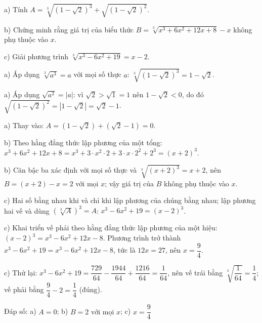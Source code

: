 \begin{problem}[9DS-CAN-015]
a) Tính $A = \sqrt[3]{(1 - \sqrt{2})^3} + \sqrt{(1 - \sqrt{2})^2}$.

b) Chứng minh rằng giá trị của biểu thức $B = \sqrt[3]{x^3 + 6x^2 + 12x + 8} - x$ không phụ thuộc vào $x$.

c) Giải phương trình $\sqrt[3]{x^3 - 6x^2 + 19} = x - 2$.

\begin{solution}
a) Áp dụng $\sqrt[3]{a^3} = a$ với mọi số thực $a$: $\sqrt[3]{(1 - \sqrt{2})^3} = 1 - \sqrt{2}$.

a) Áp dụng $\sqrt{a^2} = |a|$: vì $\sqrt{2} > \sqrt{1} = 1$ nên $1 - \sqrt{2} < 0$, do đó $\sqrt{(1 - \sqrt{2})^2} = |1 - \sqrt{2}| = \sqrt{2} - 1$.

a) Thay vào: $A = (1 - \sqrt{2}) + (\sqrt{2} - 1) = 0$.

b) Theo hằng đẳng thức lập phương của một tổng: $x^3 + 6x^2 + 12x + 8 = x^3 + 3 \cdot x^2 \cdot 2 + 3 \cdot x \cdot 2^2 + 2^3 = (x + 2)^3$.

b) Căn bậc ba xác định với mọi số thực và $\sqrt[3]{(x + 2)^3} = x + 2$, nên $B = (x + 2) - x = 2$ với mọi $x$; vậy giá trị của $B$ không phụ thuộc vào $x$.

c) Hai số bằng nhau khi và chỉ khi lập phương của chúng bằng nhau; lập phương hai vế và dùng $\left(\sqrt[3]{A}\right)^3 = A$: $x^3 - 6x^2 + 19 = (x - 2)^3$.

c) Khai triển vế phải theo hằng đẳng thức lập phương của một hiệu: $(x - 2)^3 = x^3 - 6x^2 + 12x - 8$. Phương trình trở thành $x^3 - 6x^2 + 19 = x^3 - 6x^2 + 12x - 8$, tức là $12x = 27$, nên $x = \dfrac{9}{4}$.

c) Thử lại: $x^3 - 6x^2 + 19 = \dfrac{729}{64} - \dfrac{1944}{64} + \dfrac{1216}{64} = \dfrac{1}{64}$, nên vế trái bằng $\sqrt[3]{\dfrac{1}{64}} = \dfrac{1}{4}$; vế phải bằng $\dfrac{9}{4} - 2 = \dfrac{1}{4}$ (đúng).

Đáp số: a) $\boxed{A = 0}$; b) $\boxed{B = 2 \text{ với mọi } x}$; c) $\boxed{x = \dfrac{9}{4}}$
\end{solution}
\end{problem}

